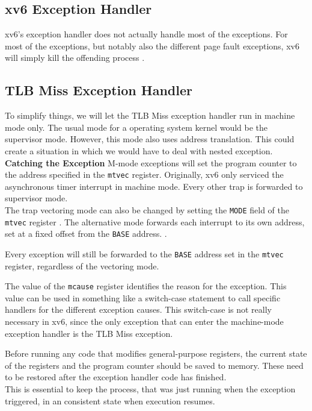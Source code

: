 \subsection{xv6 Exception Handler}
xv6's exception handler does not actually handle most of the exceptions. For most of the exceptions,
but notably also the different page fault exceptions, xv6 will simply kill the offending process \cite{cox2011xv6}.

\subsection{TLB Miss Exception Handler}
To simplify things, we will let the TLB Miss exception handler run in machine mode only.
The usual mode for a operating system kernel would be the supervisor mode. However, this
mode also uses address translation. This could create a situation in which we would have
to deal with nested exception.\\

\textbf{Catching the Exception} M-mode exceptions will set the program counter to the address
specified in the \texttt{mtvec} register. Originally, xv6 only serviced the asynchronous
timer interrupt in machine mode. Every other trap is forwarded to supervisor mode.\\
The trap vectoring mode can also be changed by setting the \texttt{MODE} field of the
\texttt{mtvec} register \cite{RISCVInstructionSet}. The alternative mode forwards
each interrupt to its own address, set at a fixed offset from the \texttt{BASE} address.
.

Every exception will still be forwarded to the \texttt{BASE} address set in the \texttt{mtvec}
register, regardless of the vectoring mode.

The value of the \texttt{mcause} register identifies the reason for the exception.
This value can be used in something like a switch-case statement to call specific handlers
for the different exception causes.
This switch-case is not really necessary in xv6, since the only exception that can enter
the machine-mode exception handler is the TLB Miss exception.

Before running any code that modifies general-purpose registers, the current state of the
registers and the program counter should be saved to memory. These need to be restored after
the exception handler code has finished.\\
This is essential to keep the process, that was just running when the exception triggered,
in an consistent state when execution resumes.

